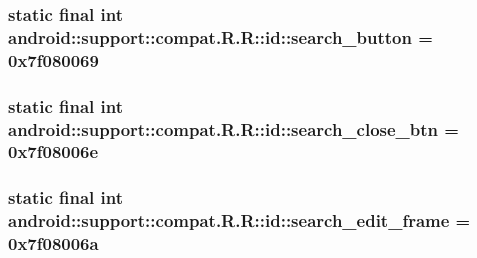 \hypertarget{classandroid_1_1support_1_1compat_1_1_r_1_1id_de237571d509c5f90f13fe4095f59793}{
\subsubsection[{search\_\-button}]{\setlength{\rightskip}{0pt plus 5cm}static final int android::support::compat.R.R::id::search\_\-button = 0x7f080069}}
\label{classandroid_1_1support_1_1compat_1_1_r_1_1id_de237571d509c5f90f13fe4095f59793}


\hypertarget{classandroid_1_1support_1_1compat_1_1_r_1_1id_54c8b567b46bd4b24396b8889fef7e01}{
\subsubsection[{search\_\-close\_\-btn}]{\setlength{\rightskip}{0pt plus 5cm}static final int android::support::compat.R.R::id::search\_\-close\_\-btn = 0x7f08006e}}
\label{classandroid_1_1support_1_1compat_1_1_r_1_1id_54c8b567b46bd4b24396b8889fef7e01}


\hypertarget{classandroid_1_1support_1_1compat_1_1_r_1_1id_18513b00286f1f718f0dcfc13906ba5d}{
\subsubsection[{search\_\-edit\_\-frame}]{\setlength{\rightskip}{0pt plus 5cm}static final int android::support::compat.R.R::id::search\_\-edit\_\-frame = 0x7f08006a}}
\label{classandroid_1_1support_1_1compat_1_1_r_1_1id_18513b00286f1f718f0dcfc13906ba5d}



